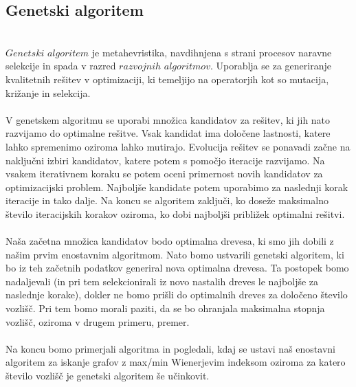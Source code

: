 \documentclass[12pt,a4paper]{amsart}
\theoremstyle{definition} %
\theoremstyle{plain} %
\begin{document}
\subsection{Genetski algoritem}
\
\\
$Genetski$ $algoritem$ je metahevristika, navdihnjena s strani procesov naravne selekcije in spada v razred $razvojnih$
$algoritmov$. Uporablja se za generiranje kvalitetnih rešitev v optimizaciji, ki temeljijo na operatorjih kot so mutacija, križanje
in selekcija.  
\\
\\
V genetskem algoritmu se uporabi množica kandidatov za rešitev, ki jih nato razvijamo do optimalne rešitve. Vsak kandidat
ima določene lastnosti, katere lahko spremenimo oziroma lahko mutirajo. Evolucija rešitev se ponavadi začne na naključni izbiri kandidatov,
katere potem s pomočjo iteracije razvijamo. Na vsakem iterativnem koraku se potem oceni primernost novih kandidatov za optimizacijski
problem. Najboljše kandidate potem uporabimo za naslednji korak iteracije in tako dalje. Na koncu se algoritem zaključi,
ko doseže maksimalno število iteracijskih korakov oziroma, ko dobi najboljši približek optimalni rešitvi.
\\
\\
Naša začetna množica kandidatov bodo optimalna drevesa, ki smo jih dobili z našim prvim enostavnim algoritmom. 
Nato bomo ustvarili genetski algoritem, ki bo iz teh začetnih podatkov generiral nova optimalna drevesa. Ta postopek bomo
nadaljevali (in pri tem selekcionirali iz novo nastalih dreves le najboljše za naslednje korake), dokler ne bomo prišli do optimalnih 
dreves za določeno število vozlišč. Pri tem bomo morali paziti, da se bo ohranjala maksimalna stopnja vozlišč, 
oziroma v drugem primeru, premer. 
\\
\\
Na koncu bomo primerjali algoritma in pogledali, kdaj se ustavi naš enostavni algoritem za iskanje grafov z max/min Wienerjevim indeksom
oziroma za katero število vozlišč je genetski algoritem še učinkovit.
\end{document}
